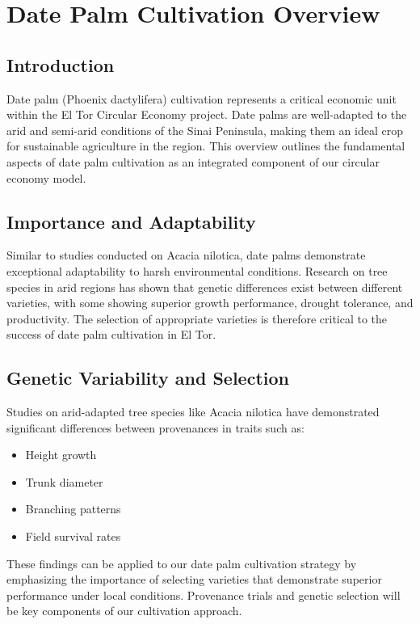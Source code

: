 \section{Date Palm Cultivation Overview}

\subsection{Introduction}
Date palm (Phoenix dactylifera) cultivation represents a critical economic unit within the El Tor Circular Economy project. Date palms are well-adapted to the arid and semi-arid conditions of the Sinai Peninsula, making them an ideal crop for sustainable agriculture in the region. This overview outlines the fundamental aspects of date palm cultivation as an integrated component of our circular economy model.

\subsection{Importance and Adaptability}
Similar to studies conducted on Acacia nilotica, date palms demonstrate exceptional adaptability to harsh environmental conditions. Research on tree species in arid regions has shown that genetic differences exist between different varieties, with some showing superior growth performance, drought tolerance, and productivity. The selection of appropriate varieties is therefore critical to the success of date palm cultivation in El Tor.

\subsection{Genetic Variability and Selection}
Studies on arid-adapted tree species like Acacia nilotica have demonstrated significant differences between provenances in traits such as:
\begin{itemize}
    \item Height growth
    \item Trunk diameter
    \item Branching patterns
    \item Field survival rates
\end{itemize}

These findings can be applied to our date palm cultivation strategy by emphasizing the importance of selecting varieties that demonstrate superior performance under local conditions. Provenance trials and genetic selection will be key components of our cultivation approach.

